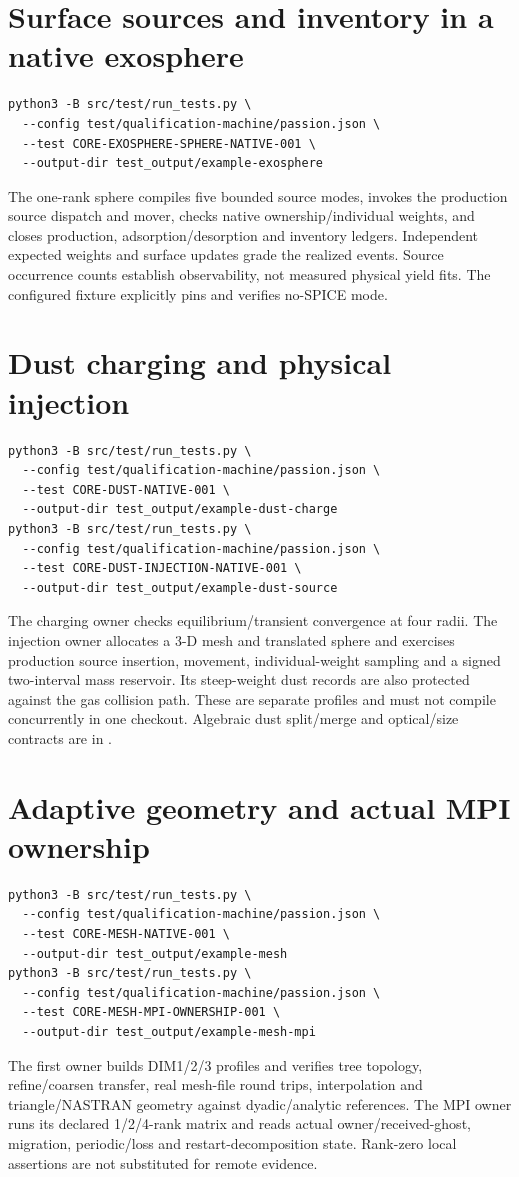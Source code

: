 \section{Surface sources and inventory in a native exosphere}
\begin{lstlisting}
python3 -B src/test/run_tests.py \
  --config test/qualification-machine/passion.json \
  --test CORE-EXOSPHERE-SPHERE-NATIVE-001 \
  --output-dir test_output/example-exosphere
\end{lstlisting}
The one-rank sphere compiles five bounded source modes, invokes the production
source dispatch and mover, checks native ownership/individual weights, and
closes production, adsorption/desorption and inventory ledgers. Independent
expected weights and surface updates grade the realized events. Source
occurrence counts establish observability, not measured physical yield fits.
The configured fixture explicitly pins and verifies no-SPICE mode.

\section{Dust charging and physical injection}
\begin{lstlisting}
python3 -B src/test/run_tests.py \
  --config test/qualification-machine/passion.json \
  --test CORE-DUST-NATIVE-001 \
  --output-dir test_output/example-dust-charge
python3 -B src/test/run_tests.py \
  --config test/qualification-machine/passion.json \
  --test CORE-DUST-INJECTION-NATIVE-001 \
  --output-dir test_output/example-dust-source
\end{lstlisting}
The charging owner checks equilibrium/transient convergence at four radii.
The injection owner allocates a 3-D mesh and translated sphere and exercises
production source insertion, movement, individual-weight sampling and a
signed two-interval mass reservoir. Its steep-weight dust records are also
protected against the gas collision path. These are separate profiles and
must not compile concurrently in one checkout. Algebraic dust split/merge
and optical/size contracts are in .

\section{Adaptive geometry and actual MPI ownership}
\begin{lstlisting}
python3 -B src/test/run_tests.py \
  --config test/qualification-machine/passion.json \
  --test CORE-MESH-NATIVE-001 \
  --output-dir test_output/example-mesh
python3 -B src/test/run_tests.py \
  --config test/qualification-machine/passion.json \
  --test CORE-MESH-MPI-OWNERSHIP-001 \
  --output-dir test_output/example-mesh-mpi
\end{lstlisting}
The first owner builds DIM1/2/3 profiles and verifies tree topology,
refine/coarsen transfer, real mesh-file round trips, interpolation and
triangle/NASTRAN geometry against dyadic/analytic references. The MPI owner
runs its declared 1/2/4-rank matrix and reads actual owner/received-ghost,
migration, periodic/loss and restart-decomposition state. Rank-zero local
assertions are not substituted for remote evidence.

